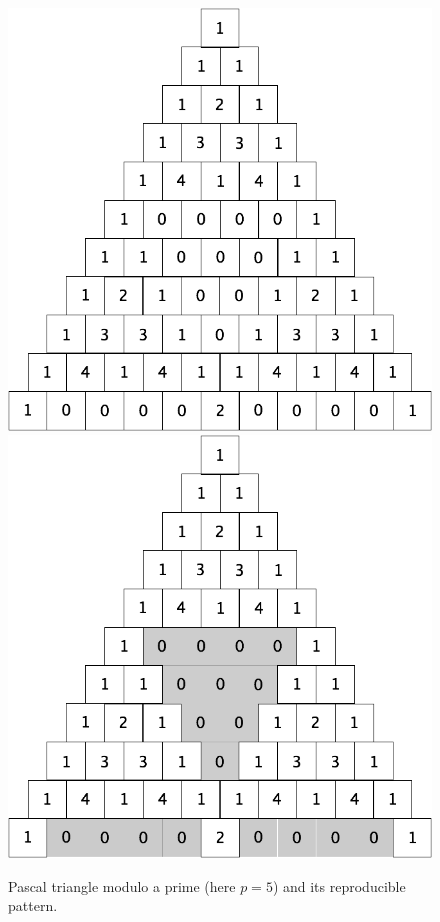 \begin{figure}[h]
\begin{center}
        \includegraphics[scale=0.2]{FiguresArithmetic/TrianglePascalModulo5init.png}
         \includegraphics[scale=0.2]{FiguresArithmetic/TrianglePascalModulo5.png}
        \caption{Pascal triangle modulo a prime (here $p=5$) and its reproducible pattern.}
        \label{fig:TriangleModulo5}
\end{center}
\end{figure}

